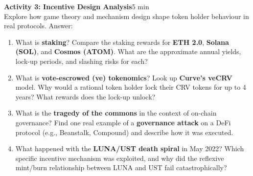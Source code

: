 \documentclass[11pt,a4paper]{article}
\newcommand{\activitybox}[3]{%
  \noindent\colorbox{mllavender4}{\parbox{\dimexpr\linewidth-2\fboxsep}{%
    \textbf{\color{mlpurple}#1}\hfill\textcolor{mlgray}{\small #2}\\[2pt]#3%
  }}\par\vspace{4pt}%
}
\begin{document}
\activitybox{Activity 3: Incentive Design Analysis}{5 min}{%
Explore how game theory and mechanism design shape token holder behaviour in real protocols. Answer:
\begin{enumerate}
\item What is \textbf{staking}? Compare the staking rewards for \textbf{ETH 2.0}, \textbf{Solana (SOL)}, and \textbf{Cosmos (ATOM)}. What are the approximate annual yields, lock-up periods, and slashing risks for each?
\item What is \textbf{vote-escrowed (ve) tokenomics}? Look up \textbf{Curve's veCRV} model. Why would a rational token holder lock their CRV tokens for up to 4 years? What rewards does the lock-up unlock?
\item What is the \textbf{tragedy of the commons} in the context of on-chain governance? Find one real example of a \textbf{governance attack} on a DeFi protocol (e.g., Beanstalk, Compound) and describe how it was executed.
\item What happened with the \textbf{LUNA/UST death spiral} in May 2022? Which specific incentive mechanism was exploited, and why did the reflexive mint/burn relationship between LUNA and UST fail catastrophically?
\end{enumerate}
\vspace{2pt}
}

\vspace{2pt}
\end{document}
